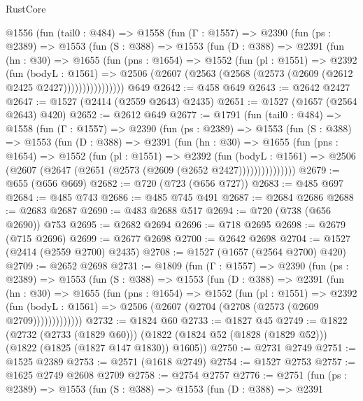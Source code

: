 \begin{lexlean}{RustCore}
\begin{coremodule}
    @1556
      (fun (tail0 : @484) =>
      @1558
        (fun (Γ : @1557) =>
        @2390
          (fun (ps : @2389) =>
          @1553
            (fun (S : @388) =>
            @1553
              (fun (D : @388) =>
              @2391
                (fun (hn : @30) =>
                @1655
                  (fun (pns : @1654) =>
                  @1552
                    (fun (pl : @1551) =>
                    @2392
                      (fun (bodyL : @1561) =>
                      @2506 (@2607 (@2563 (@2568 (@2573 (@2609 (@2612 @2425 @2427))))))))))))))))
    @649
@2642 := @458 @649
@2643 := @2642 @2427
@2647 := @1527 (@2414 (@2559 @2643) @2435)
@2651 := @1527 (@1657 (@2564 @2643) @420)
@2652 := @2612 @649
@2677 := @1791
    (fun (tail0 : @484) =>
    @1558
      (fun (Γ : @1557) =>
      @2390
        (fun (ps : @2389) =>
        @1553
          (fun (S : @388) =>
          @1553
            (fun (D : @388) =>
            @2391
              (fun (hn : @30) =>
              @1655
                (fun (pns : @1654) =>
                @1552
                  (fun (pl : @1551) =>
                  @2392
                    (fun (bodyL : @1561) =>
                    @2506 (@2607 (@2647 (@2651 (@2573 (@2609 (@2652 @2427)))))))))))))))
@2679 := @655 (@656 @669)
@2682 := @720 (@723 (@656 @727))
@2683 := @485 @697
@2684 := @485 @743
@2686 := @485 @745 @491
@2687 := @2684 @2686
@2688 := @2683 @2687
@2690 := @483 @2688 @517
@2694 := @720 (@738 (@656 @2690)) @753
@2695 := @2682 @2694
@2696 := @718 @2695
@2698 := @2679 (@715 @2696)
@2699 := @2677 @2698
@2700 := @2642 @2698
@2704 := @1527 (@2414 (@2559 @2700) @2435)
@2708 := @1527 (@1657 (@2564 @2700) @420)
@2709 := @2652 @2698
@2731 := @1809
    (fun (Γ : @1557) =>
    @2390
      (fun (ps : @2389) =>
      @1553
        (fun (S : @388) =>
        @1553
          (fun (D : @388) =>
          @2391
            (fun (hn : @30) =>
            @1655
              (fun (pns : @1654) =>
              @1552
                (fun (pl : @1551) =>
                @2392
                  (fun (bodyL : @1561) =>
                  @2506 (@2607 (@2704 (@2708 (@2573 (@2609 @2709)))))))))))))
@2732 := @1824 @60
@2733 := @1827 @45
@2749 := @1822
    (@2732 (@2733 (@1829 @60)))
    (@1822 (@1824 @52 (@1828 (@1829 @52))) (@1822 (@1825 (@1827 @147 @1830)) @1605))
@2750 := @2731 @2749
@2751 := @1525 @2389
@2753 := @2571 (@1618 @2749)
@2754 := @1527 @2753
@2757 := @1625 @2749 @2608 @2709
@2758 := @2754 @2757
@2776 := @2751
    (fun (ps : @2389) =>
    @1553
      (fun (S : @388) =>
      @1553
        (fun (D : @388) =>
        @2391

\end{coremodule}
\end{lexlean}

